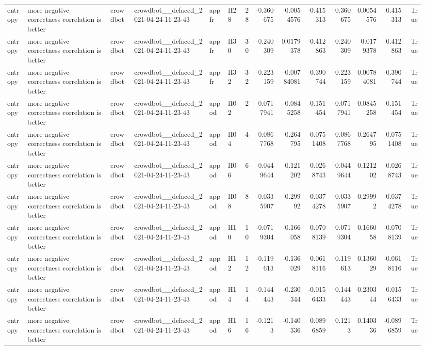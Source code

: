 \begin{longtable}{llllllrrrrrrrr}
entropy & more negative correctness correlation is better & crowdbot & crowdbot\_\_defaced\_2021-04-24-11-23-43 & appfr & H28 & 28 & -0.360675 & -0.0054576 & -0.415313 & 0.360675 & 0.0054576 & 0.415313 & True \\
entropy & more negative correctness correlation is better & crowdbot & crowdbot\_\_defaced\_2021-04-24-11-23-43 & appfr & H30 & 30 & -0.240309 & 0.0179378 & -0.412863 & 0.240309 & -0.0179378 & 0.412863 & True \\
entropy & more negative correctness correlation is better & crowdbot & crowdbot\_\_defaced\_2021-04-24-11-23-43 & appfr & H32 & 32 & -0.223159 & -0.00784081 & -0.390744 & 0.223159 & 0.00784081 & 0.390744 & True \\
entropy & more negative correctness correlation is better & crowdbot & crowdbot\_\_defaced\_2021-04-24-11-23-43 & appod & H02 & 2 & 0.0717941 & -0.0845258 & 0.151454 & -0.0717941 & 0.0845258 & -0.151454 & True \\
entropy & more negative correctness correlation is better & crowdbot & crowdbot\_\_defaced\_2021-04-24-11-23-43 & appod & H04 & 4 & 0.0867768 & -0.264795 & 0.0751408 & -0.0867768 & 0.264795 & -0.0751408 & True \\
entropy & more negative correctness correlation is better & crowdbot & crowdbot\_\_defaced\_2021-04-24-11-23-43 & appod & H06 & 6 & -0.0449644 & -0.121202 & 0.0268743 & 0.0449644 & 0.121202 & -0.0268743 & True \\
entropy & more negative correctness correlation is better & crowdbot & crowdbot\_\_defaced\_2021-04-24-11-23-43 & appod & H08 & 8 & -0.0335907 & -0.29992 & 0.0374278 & 0.0335907 & 0.29992 & -0.0374278 & True \\
entropy & more negative correctness correlation is better & crowdbot & crowdbot\_\_defaced\_2021-04-24-11-23-43 & appod & H10 & 10 & -0.0719304 & -0.166058 & 0.0708139 & 0.0719304 & 0.166058 & -0.0708139 & True \\
entropy & more negative correctness correlation is better & crowdbot & crowdbot\_\_defaced\_2021-04-24-11-23-43 & appod & H12 & 12 & -0.119613 & -0.136029 & 0.0618116 & 0.119613 & 0.136029 & -0.0618116 & True \\
entropy & more negative correctness correlation is better & crowdbot & crowdbot\_\_defaced\_2021-04-24-11-23-43 & appod & H14 & 14 & -0.144443 & -0.230344 & -0.0156433 & 0.144443 & 0.230344 & 0.0156433 & True \\
entropy & more negative correctness correlation is better & crowdbot & crowdbot\_\_defaced\_2021-04-24-11-23-43 & appod & H16 & 16 & -0.1213 & -0.140336 & 0.0896859 & 0.1213 & 0.140336 & -0.0896859 & True \\

\end{longtable}
